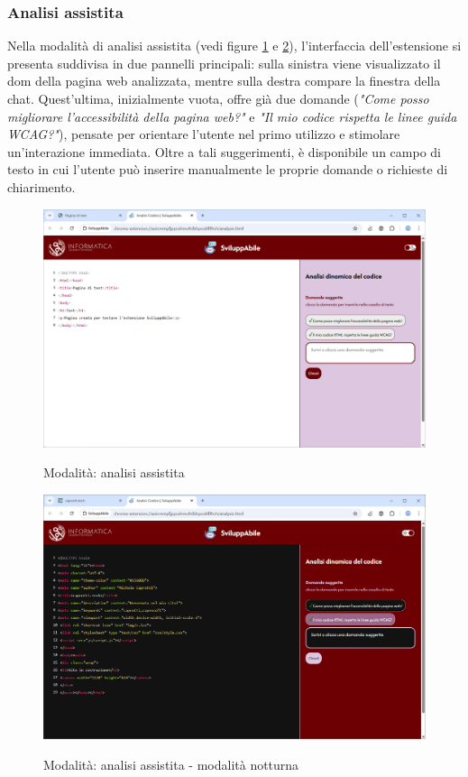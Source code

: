 \subsubsection{Analisi assistita}
\noindent Nella modalità di analisi assistita (vedi figure \ref{fig:aass} e \ref{fig:aass_notte}), l’interfaccia dell’estensione si presenta suddivisa in due pannelli principali: sulla sinistra viene visualizzato il \acrshort{dom} della pagina web analizzata, mentre sulla destra compare la finestra della chat. Quest’ultima, inizialmente vuota, offre già due domande (\textit{"Come posso migliorare l'accessibilità della pagina web?"} e \textit{"Il mio codice rispetta le linee guida WCAG?"}), pensate per orientare l’utente nel primo utilizzo e stimolare un’interazione immediata. Oltre a tali suggerimenti, è disponibile un campo di testo in cui l’utente può inserire manualmente le proprie domande o richieste di chiarimento.\\

\begin{figure}[H]
    \centering
    \includegraphics[width=1\linewidth, alt={Modalità di analisi assistita}]{img/analisi_ass.png}
    \caption{Modalità: analisi assistita}\label{fig:aass}
\end{figure}

\begin{figure}[H]
    \centering
    \includegraphics[width=1\linewidth, alt={Modalità di analisi assistita - modalità notturna}]{img/analisi_ass_dark.png}
    \caption{Modalità: analisi assistita - modalità notturna}\label{fig:aass_notte}
\end{figure}


